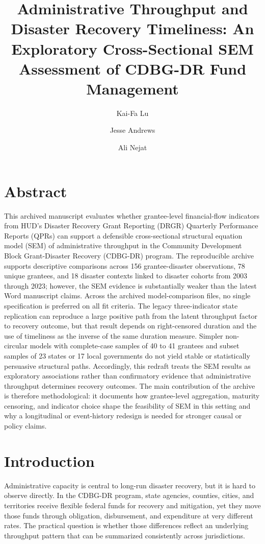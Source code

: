 \documentclass[
  letterpaper,
]{article}
\title{Administrative Throughput and Disaster Recovery Timeliness: An
Exploratory Cross-Sectional SEM Assessment of CDBG-DR Fund Management}
\author{Kai-Fa Lu \and Jesse Andrews \and Ali Nejat}
\date{}
\renewcommand*\contentsname{Table of contents}
\newcommand\contentsname{Table of contents}
\begin{document}
\maketitle

\renewcommand*\contentsname{Table of contents}
{
\hypersetup{linkcolor=}
\setcounter{tocdepth}{3}
\tableofcontents
}

\section*{Abstract}\label{abstract}

This archived manuscript evaluates whether grantee-level financial-flow
indicators from HUD's Disaster Recovery Grant Reporting (DRGR) Quarterly
Performance Reports (QPRs) can support a defensible cross-sectional
structural equation model (SEM) of administrative throughput in the
Community Development Block Grant-Disaster Recovery (CDBG-DR) program.
The reproducible archive supports descriptive comparisons across 156
grantee-disaster observations, 78 unique grantees, and 18 disaster
contexts linked to disaster cohorts from 2003 through 2023; however, the
SEM evidence is substantially weaker than the latest Word manuscript
claims. Across the archived model-comparison files, no single
specification is preferred on all fit criteria. The legacy
three-indicator state replication can reproduce a large positive path
from the latent throughput factor to recovery outcome, but that result
depends on right-censored duration and the use of timeliness as the
inverse of the same duration measure. Simpler non-circular models with
complete-case samples of 40 to 41 grantees and subset samples of 23
states or 17 local governments do not yield stable or statistically
persuasive structural paths. Accordingly, this redraft treats the SEM
results as exploratory associations rather than confirmatory evidence
that administrative throughput determines recovery outcomes. The main
contribution of the archive is therefore methodological: it documents
how grantee-level aggregation, maturity censoring, and indicator choice
shape the feasibility of SEM in this setting and why a longitudinal or
event-history redesign is needed for stronger causal or policy claims.

\section{Introduction}\label{introduction}

Administrative capacity is central to long-run disaster recovery, but it
is hard to observe directly. In the CDBG-DR program, state agencies,
counties, cities, and territories receive flexible federal funds for
recovery and mitigation, yet they move those funds through obligation,
disbursement, and expenditure at very different rates. The practical
question is whether those differences reflect an underlying throughput
pattern that can be summarized consistently across jurisdictions.
\end{document}
